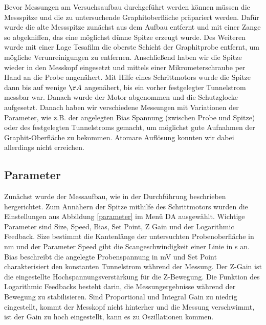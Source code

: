 \documentclass[10pt,a4paper]{article}
\begin{document}
Bevor Messungen am Versuchsaufbau durchgeführt werden können müssen die Messspitze und die zu untersuchende Graphitoberfläche präpariert werden. Dafür wurde die alte Messspitze zunächst aus dem Aufbau entfernt und mit einer Zange so abgekniffen, das eine möglichst dünne Spitze erzeugt wurde. Des Weiteren wurde mit einer Lage Tesafilm die oberste Schicht der Graphitprobe entfernt, um mögliche Verunreinigungen zu entfernen. Anschließend haben wir die Spitze wieder in den Messkopf eingesetzt und mittels einer Mikrometerschraube per Hand an die Probe angenähert. Mit Hilfe eines Schrittmotors wurde die Spitze dann bis auf wenige $\AA$ angenähert, bis ein vorher festgelegter Tunnelstrom messbar war. Danach wurde der Motor abgenommen und die Schutzglocke aufgesetzt. Danach haben wir verschiedene Messungen mit Variationen der Parameter, wie z.B. der angelegten Bias Spannung (zwischen Probe und Spitze) oder des festgelegten Tunnelstroms gemacht, um möglichst gute Aufnahmen der Graphit-Oberfläche zu bekommen. Atomare Auflösung konnten wir dabei allerdings nicht erreichen.

\subsection{Parameter}

Zunächst wurde der Messaufbau, wie in der Durchführung beschrieben hergerichtet. Zum Annähern der Spitze mithilfe des Schrittmotors wurden die Einstellungen aus Abbildung \ref{parameter} im Menü DA ausgewählt. Wichtige Parameter sind Size, Speed, Bias, Set Point, Z Gain und der Logarithmic Feedback. Size bestimmt die Kantenlänge der untersuchten Probenoberfläche in nm und der Parameter Speed gibt die Scangeschwindigkeit einer Linie in s an. Bias beschreibt die angelegte Probenspannung in mV und Set Point charakterisiert den konstanten Tunnelstrom während der Messung. Der Z-Gain ist die eingestellte Hochspannungsverstärkung für die Z-Bewegung. Die Funktion des Logarithmic Feedbacks besteht darin, die Messungergebnisse während der Bewegung zu stabilisieren. Sind Proportional und Integral Gain zu niedrig eingestellt, kommt der Messkopf nicht hinterher und die Messung verschwimmt, ist der Gain zu hoch eingestellt, kann es zu Oszillationen kommen. 
\end{document}
